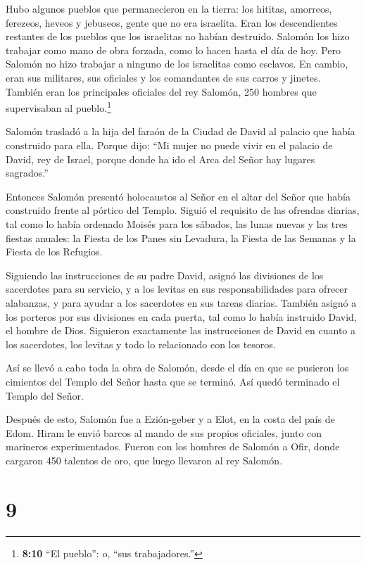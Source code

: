  Hubo algunos pueblos que permanecieron en la tierra: los
hititas, amorreos, ferezeos, heveos y jebuseos, gente que no era
israelita.  Eran los descendientes restantes de los pueblos
que los israelitas no habían destruido. Salomón los hizo trabajar como
mano de obra forzada, como lo hacen hasta el día de hoy. 
Pero Salomón no hizo trabajar a ninguno de los israelitas como esclavos.
En cambio, eran sus militares, sus oficiales y los comandantes de sus
carros y jinetes.  También eran los principales oficiales
del rey Salomón, 250 hombres que supervisaban al pueblo.\footnote{\textbf{8:10}
  ``El pueblo'': o, ``sus trabajadores.''}

 Salomón trasladó a la hija del faraón de la Ciudad de
David al palacio que había construido para ella. Porque dijo: ``Mi mujer
no puede vivir en el palacio de David, rey de Israel, porque donde ha
ido el Arca del Señor hay lugares sagrados.''

 Entonces Salomón presentó holocaustos al Señor en el altar
del Señor que había construido frente al pórtico del Templo.
 Siguió el requisito de las ofrendas diarias, tal como lo
había ordenado Moisés para los sábados, las lunas nuevas y las tres
fiestas anuales: la Fiesta de los Panes sin Levadura, la Fiesta de las
Semanas y la Fiesta de los Refugios.

 Siguiendo las instrucciones de su padre David, asignó las
divisiones de los sacerdotes para su servicio, y a los levitas en sus
responsabilidades para ofrecer alabanzas, y para ayudar a los sacerdotes
en sus tareas diarias. También asignó a los porteros por sus divisiones
en cada puerta, tal como lo había instruido David, el hombre de Dios.
 Siguieron exactamente las instrucciones de David en cuanto
a los sacerdotes, los levitas y todo lo relacionado con los tesoros.

 Así se llevó a cabo toda la obra de Salomón, desde el día
en que se pusieron los cimientos del Templo del Señor hasta que se
terminó. Así quedó terminado el Templo del Señor.

 Después de esto, Salomón fue a Ezión-geber y a Elot, en la
costa del país de Edom.  Hiram le envió barcos al mando de
sus propios oficiales, junto con marineros experimentados. Fueron con
los hombres de Salomón a Ofir, donde cargaron 450 talentos de oro, que
luego llevaron al rey Salomón.

\hypertarget{section-8}{%
\section{9}\label{section-8}}


